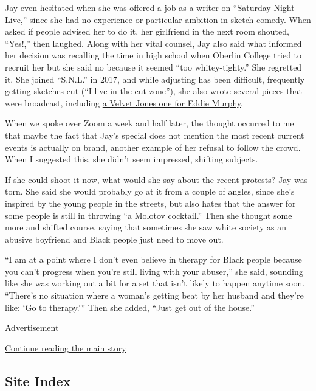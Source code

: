 Jay even hesitated when she was offered a job as a writer on
\href{https://www.nbc.com/saturday-night-live/cast/sam-jay-292972}{``Saturday
Night Live,''} since she had no experience or particular ambition in
sketch comedy. When asked if people advised her to do it, her girlfriend
in the next room shouted, ``Yes!,'' then laughed. Along with her vital
counsel, Jay also said what informed her decision was recalling the time
in high school when Oberlin College tried to recruit her but she said no
because it seemed ``too whitey-tighty.'' She regretted it. She joined
``S.N.L.'' in 2017, and while adjusting has been difficult, frequently
getting sketches cut (``I live in the cut zone''), she also wrote
several pieces that were broadcast, including
\href{https://www.nbc.com/saturday-night-live/video/black-jeopardy-velvet-jones/4088748}{a
Velvet Jones one for Eddie Murphy}.

When we spoke over Zoom a week and half later, the thought occurred to
me that maybe the fact that Jay's special does not mention the most
recent current events is actually on brand, another example of her
refusal to follow the crowd. When I suggested this, she didn't seem
impressed, shifting subjects.

If she could shoot it now, what would she say about the recent protests?
Jay was torn. She said she would probably go at it from a couple of
angles, since she's inspired by the young people in the streets, but
also hates that the answer for some people is still in throwing ``a
Molotov cocktail.'' Then she thought some more and shifted course,
saying that sometimes she saw white society as an abusive boyfriend and
Black people just need to move out.

``I am at a point where I don't even believe in therapy for Black people
because you can't progress when you're still living with your abuser,''
she said, sounding like she was working out a bit for a set that isn't
likely to happen anytime soon. ``There's no situation where a woman's
getting beat by her husband and they're like: `Go to therapy.''' Then
she added, ``Just get out of the house.''

Advertisement

\protect\hyperlink{after-bottom}{Continue reading the main story}

\hypertarget{site-index}{%
\subsection{Site Index}\label{site-index}}

